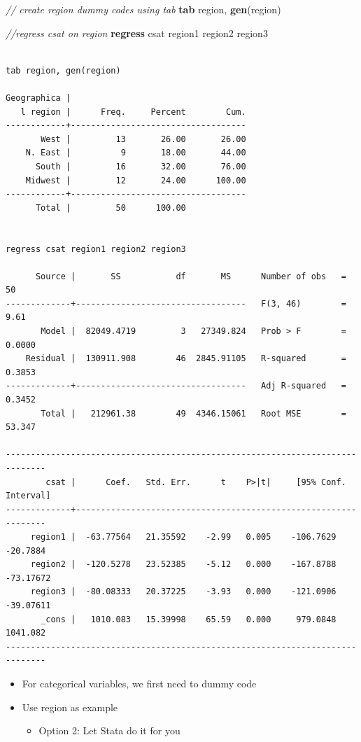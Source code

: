 \documentclass[]{book}
\newenvironment{Shaded}{\begin{snugshade}}{\end{snugshade}}
\newcommand{\CommentTok}[1]{\textcolor[rgb]{0.56,0.35,0.01}{\textit{#1}}}
\newcommand{\KeywordTok}[1]{\textcolor[rgb]{0.13,0.29,0.53}{\textbf{#1}}}
\newcommand{\NormalTok}[1]{#1}
\providecommand{\tightlist}{%
  \setlength{\itemsep}{0pt}\setlength{\parskip}{0pt}}
\begin{document}
\begin{Shaded}
\begin{Highlighting}[]
  \CommentTok{// create region dummy codes using tab }
  \KeywordTok{tab}\NormalTok{ region, }\KeywordTok{gen}\NormalTok{(region)}

  \CommentTok{//regress csat on region}
  \KeywordTok{regress}\NormalTok{ csat region1 region2 region3}
\end{Highlighting}
\end{Shaded}

\begin{verbatim}

tab region, gen(region)

Geographica |
   l region |      Freq.     Percent        Cum.
------------+-----------------------------------
       West |         13       26.00       26.00
    N. East |          9       18.00       44.00
      South |         16       32.00       76.00
    Midwest |         12       24.00      100.00
------------+-----------------------------------
      Total |         50      100.00


regress csat region1 region2 region3

      Source |       SS           df       MS      Number of obs   =        50
-------------+----------------------------------   F(3, 46)        =      9.61
       Model |  82049.4719         3   27349.824   Prob > F        =    0.0000
    Residual |  130911.908        46  2845.91105   R-squared       =    0.3853
-------------+----------------------------------   Adj R-squared   =    0.3452
       Total |   212961.38        49  4346.15061   Root MSE        =    53.347

------------------------------------------------------------------------------
        csat |      Coef.   Std. Err.      t    P>|t|     [95% Conf. Interval]
-------------+----------------------------------------------------------------
     region1 |  -63.77564   21.35592    -2.99   0.005    -106.7629    -20.7884
     region2 |  -120.5278   23.52385    -5.12   0.000    -167.8788   -73.17672
     region3 |  -80.08333   20.37225    -3.93   0.000    -121.0906   -39.07611
       _cons |   1010.083   15.39998    65.59   0.000     979.0848    1041.082
------------------------------------------------------------------------------
\end{verbatim}

\begin{itemize}
\tightlist
\item
  For categorical variables, we first need to dummy code
\item
  Use region as example

  \begin{itemize}
  \tightlist
  \item
    Option 2: Let Stata do it for you
  \end{itemize}
\end{itemize}
\end{document}
